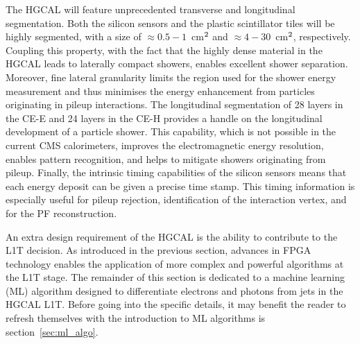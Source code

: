 The HGCAL will feature unprecedented transverse and longitudinal segmentation. Both the silicon sensors and the plastic scintillator tiles will be highly segmented, with a size of $\approx0.5-1$~cm$^{\rm{2}}$ and $\approx4-30$~cm$^{\rm{2}}$, respectively. Coupling this property, with the fact that the highly dense material in the HGCAL leads to laterally compact showers, enables excellent shower separation. Moreover, fine lateral granularity limits the region used for the shower energy measurement and thus minimises the energy enhancement from particles originating in pileup interactions. The longitudinal segmentation of 28 layers in the CE-E and 24 layers in the CE-H provides a handle on the longitudinal development of a particle  shower. This capability, which is not possible in the current CMS calorimeters, improves the electromagnetic energy resolution, enables pattern recognition, and helps to mitigate showers originating from pileup. Finally, the intrinsic timing capabilities of the silicon sensors means that each energy deposit can be given a precise time stamp. This timing information is especially useful for pileup rejection, identification of the interaction vertex, and for the PF reconstruction.


An extra design requirement of the HGCAL is the ability to contribute to the L1T decision.
As introduced in the previous section, advances in FPGA technology enables the application of more complex and powerful algorithms at the L1T stage. The remainder of this section is dedicated to a machine learning (ML) algorithm designed to differentiate electrons and photons from jets in the HGCAL L1T. Before going into the specific details, it may benefit the reader to refresh themselves with the introduction to ML algorithms is section~\ref{sec:ml_algo}.

